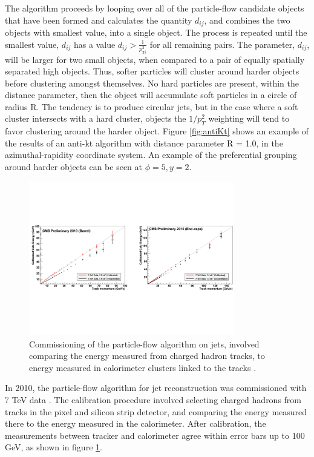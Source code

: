 \par The algorithm proceeds by looping over all of the particle-flow
candidate objects that have been formed and calculates the quantity
$d_{ij}$, and combines the two objects with smallest value, into a
single object.  The process is repeated until the smallest value,
$d_{ij}$ has a value $d_{ij} > \frac{1}{p_{Ti}^{2}}$ for all remaining
pairs.  The parameter, $d_{ij}$, will be larger for two small \PT
objects, when compared to a pair of equally spatially separated high
\PT objects.  Thus, softer particles will cluster around harder
objects before clustering amongst themselves.  No hard particles are
present, within the distance parameter, then the object will
accumulate soft particles in a circle of radius R.  The tendency is to
produce circular jets, but in the case where a soft \PT cluster intersects
with a hard \PT cluster, objects the $1/p_{T}^{2}$ weighting will tend
to favor clustering around the harder \PT object.  Figure
\ref{fig:antiKt} shows an example of the results of an anti-kt
algorithm with distance parameter R = 1.0, in the azimuthal-rapidity
coordinate system.  An example of the preferential grouping around
harder \PT objects can be seen at $\phi=5, y=2$.  

\begin{figure}[h]
   \centering
  \includegraphics[width=0.8\textwidth]{Figures/Reconstruction_Diagrams/Jets__PFChargedHadronCalibration.pdf}
  \caption{Commissioning of the particle-flow algorithm on jets,
    involved comparing the energy measured from charged hadron tracks,
  to energy measured in calorimeter clusters linked to the tracks
  \cite{CMS-PAS-PFT-10-002}. } \label{fig:chargedHadron_calib}
\end{figure}

\par In 2010, the particle-flow algorithm for jet reconstruction was
commissioned with 7 TeV data \cite{CMS-PAS-PFT-10-002}.  The
calibration procedure involved selecting charged hadrons from tracks
in the pixel and silicon strip detector, and comparing the energy
measured there to the energy measured in the calorimeter.  After
calibration, the measurements between tracker and calorimeter agree
within error bars up to 100 GeV, as shown in figure
\ref{fig:chargedHadron_calib}. 

